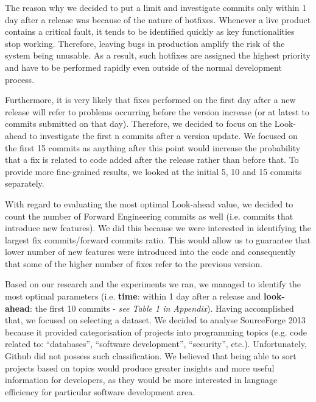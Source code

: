 The reason why we decided to put a limit and investigate commits only within 1 day after a release was because of the nature of hotfixes. Whenever a live product contains a critical fault, it tends to be identified quickly as key functionalities stop working. Therefore, leaving bugs in production amplify the risk of the system being unusable. As a result, such hotfixes are assigned the highest priority and have to be performed rapidly even outside of the normal development process.\par

Furthermore, it is very likely that fixes performed on the first day after a new release will refer to problems occurring before the version increase (or at latest to commits submitted on that day). Therefore, we decided to focus on the Look-ahead to investigate the first n commits after a version update. We focused on the first 15 commits as anything after this point would increase the probability that a fix is related to code added after the release rather than before that. To provide more fine-grained results, we looked at the initial 5, 10 and 15 commits separately.\par

With regard to evaluating the most optimal Look-ahead value, we decided to count the number of Forward Engineering commits as well (i.e. commits that introduce new features). We did this because we were interested in identifying the largest fix commits/forward commits ratio. This would allow us to guarantee that lower number of new features were introduced into the code and consequently that some of the higher number of fixes refer to the previous version.\par

Based on our research and the experiments we ran, we managed to identify the most optimal parameters (i.e. \textbf{time}: within 1 day after a release and \textbf{look-ahead}: the first 10 commits - \textit{see Table 1 in Appendix}). Having accomplished that, we focused on selecting a dataset. We decided to analyse SourceForge 2013 because it provided categorisation of projects into programming topics (e.g. code related to: “databases”, “software development”, “security”, etc.). Unfortunately, Github did not possess such classification. We believed that being able to sort projects based on topics would produce greater insights and more useful information for developers, as they would be more interested in language efficiency for particular software development area.\par

